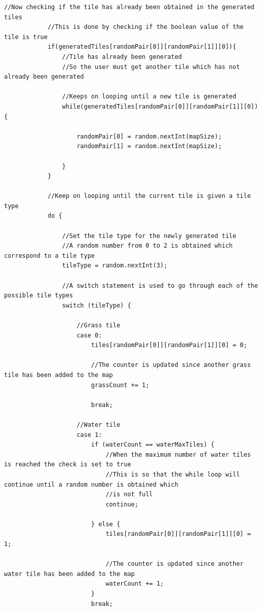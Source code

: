 \documentclass[a4paper,12pt]{extarticle}
\begin{document}
\begin{lstlisting}[caption=The initial code of the Map class]
            //Now checking if the tile has already been obtained in the generated tiles
            //This is done by checking if the boolean value of the tile is true
            if(generatedTiles[randomPair[0]][randomPair[1]][0]){
                //Tile has already been generated
                //So the user must get another tile which has not already been generated

                //Keeps on looping until a new tile is generated
                while(generatedTiles[randomPair[0]][randomPair[1]][0]){

                    randomPair[0] = random.nextInt(mapSize);
                    randomPair[1] = random.nextInt(mapSize);

                }
            }

            //Keep on looping until the current tile is given a tile type
            do {

                //Set the tile type for the newly generated tile
                //A random number from 0 to 2 is obtained which correspond to a tile type
                tileType = random.nextInt(3);

                //A switch statement is used to go through each of the possible tile types
                switch (tileType) {

                    //Grass tile
                    case 0:
                        tiles[randomPair[0]][randomPair[1]][0] = 0;

                        //The counter is updated since another grass tile has been added to the map
                        grassCount += 1;

                        break;

                    //Water tile
                    case 1:
                        if (waterCount == waterMaxTiles) {
                            //When the maximum number of water tiles is reached the check is set to true
                            //This is so that the while loop will continue until a random number is obtained which
                            //is not full
                            continue;

                        } else {
                            tiles[randomPair[0]][randomPair[1]][0] = 1;

                            //The counter is updated since another water tile has been added to the map
                            waterCount += 1;
                        }
                        break;


\end{lstlisting}
\end{document}

